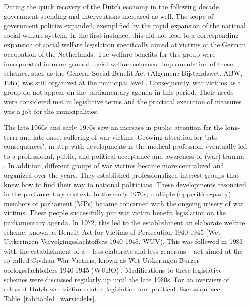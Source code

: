 \documentclass{dhbenelux}
\begin{document}
During the quick recovery of the Dutch economy in the following decade, government spending and interventions increased as well. The scope of government policies expanded, exemplified by the rapid expansion of the national social welfare system. In the first instance, this did not lead to a corresponding expansion of social welfare legislation specifically aimed at victims of the German occupation of the Netherlands. The welfare benefits for this group were incorporated in more general social welfare schemes. Implementation of these schemes, such as the General Social Benefit Act (Algemene Bijstandswet, ABW, 1965) was still organized at the municipal level \citep{zanden_een_1997}. Consequently, war victims as a group do not appear on the parliamentary agenda in this period. Their needs were considered met in legislative terms and the practical execution of measures was a job for the municipalities.

The late 1960s and early 1970s saw an increase in public attention for the long-term and late-onset suffering of war victims. Growing attention for 'late consequences', in step with developments in the medical profession, eventually led to a professional, public, and political acceptance and awareness of (war) trauma \citep{swaan_zorg_1996,withuis_conclusion_2010, withuis_totalitarianism_2010}. In addition, different groups of war victims became more centralized and organized over the years. They established professionalized interest groups that knew how to find their way to national politicians. These developments resonated in the parliamentary context. In the early 1970s, multiple (opposition-party) members of parliament (MPs) became concerned with the ongoing misery of war victims. These people successfully put war victim benefit legislation on the parliamentary agenda. In 1972, this led to the establishment an elaborate welfare scheme, known as Benefit Act for Victims of Persecution 1940-1945 (Wet Uitkeringen Vervolgingsslachtoffers 1940-1945, WUV). This was followed in 1983 with the establishment of a – less elaborate and less generous – act aimed at the so-called Civilian-War Victims, known as Wet Uitkeringen Burger-oorlogsslachtoffers 1940-1945 (WUBO) \citep{piersma_bevochten_2010}. Modifications to these legislative schemes were discussed regularly up until the late 1980s. For an overview of relevant Dutch war victim related legislation and political discussion, see Table~\ref{tab:table1_warvicdebs}.
\end{document}
